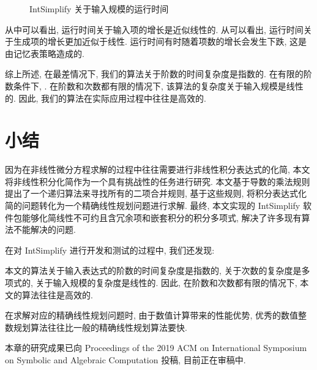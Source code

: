 \begin{figure}[htb]
\centering
{}
\caption{IntSimplify 关于输入规模的运行时间}
\label{items_all}
\end{figure}

从中可以看出, 运行时间关于输入项的增长是近似线性的. 从可以看出, 运行时间关于生成项的增长更加近似于线性. 运行时间有时随着项数的增长会发生下跌, 这是由记忆表策略造成的. 

综上所述, 在最差情况下, 我们的算法关于阶数的时间复杂度是指数的. 在有限的阶数条件下, . 在阶数和次数都有限的情况下, 该算法的复杂度关于输入规模是线性的. 因此, 我们的算法在实际应用过程中往往是高效的.  

\section{小结} \label{Conclusion-03} 
因为在非线性微分方程求解的过程中往往需要进行非线性积分表达式的化简, 本文将非线性积分化简作为一个具有挑战性的任务进行研究. 本文基于导数的乘法规则提出了一个递归算法来寻找所有的二项合并规则, 基于这些规则, 将积分表达式化简的问题转化为一个精确线性规划问题进行求解. 最终, 本文实现的 IntSimplify 软件包能够化简线性不可约且含冗余项和嵌套积分的积分多项式, 解决了许多现有算法不能解决的问题.  

在对 IntSimplify 进行开发和测试的过程中, 我们还发现:
\begin{compactenum}[(1)]
\item 本文的算法关于输入表达式的阶数的时间复杂度是指数的, 关于次数的复杂度是多项式的, 关于输入规模的复杂度是线性的. 因此, 在阶数和次数都有限的情况下, 本文的算法往往是高效的.
\item 在求解对应的精确线性规划问题时, 由于数值计算带来的性能优势, 优秀的数值整数规划算法往往比一般的精确线性规划算法要快. 
\end{compactenum}

本章的研究成果已向  Proceedings of the 2019 ACM on International Symposium on Symbolic and Algebraic Computation 投稿, 目前正在审稿中.
